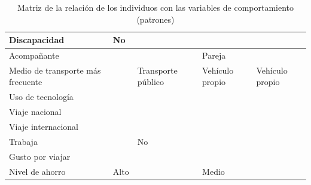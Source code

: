 \begin{table}[H]
\begin{tabular}{|p{10em}|p{7em}|p{7em}|p{7em}|p{8em}|}
        Discapacidad                      & No                                          & \cellcolor{green}{No}                         & \cellcolor{green}{No}                         &                                                   \\ \hline
        Acompañante                       &                                             & \cellcolor{blue}{Familia}                     & Pareja                                        & \cellcolor{blue}{Familia}                         \\ \hline
        Medio de transporte más frecuente &                                             & Transporte público                            & Vehículo propio                               & Vehículo propio                                   \\ \hline
        Uso de tecnología                 &                                             & \cellcolor{green}{Alto}                       & \cellcolor{green}{Alto}                       & \cellcolor{green}{Alto}                           \\ \hline
        Viaje nacional                    & \cellcolor{orange}{Si}                      & \cellcolor{orange}{Si}                        & \cellcolor{orange}{Si}                        & \cellcolor{orange}{Si}                            \\ \hline
        Viaje internacional               & \cellcolor{orange}{Si}                      & \cellcolor{orange}{Si}                        & \cellcolor{orange}{Si}                        & \cellcolor{orange}{Si}                            \\ \hline
        Trabaja                           & \cellcolor{yellow}{Si}                      & No                                            & \cellcolor{yellow}{Si}                        &                                                   \\ \hline
        Gusto por viajar                  &                                             & \cellcolor{green}{Si}                         & \cellcolor{green}{Si}                         & \cellcolor{green}{Si}                             \\ \hline
        Nivel de ahorro                   & Alto                                        & \cellcolor{purple}{Alto}                      & Medio                                         & \cellcolor{purple}{Alto}                          \\ \hline
    \end{tabular}
    \caption{Matriz de la relación de los individuos con las variables de comportamiento (patrones)}
    \label{table:relacion-individuos-variables-patrones}
\end{table}
